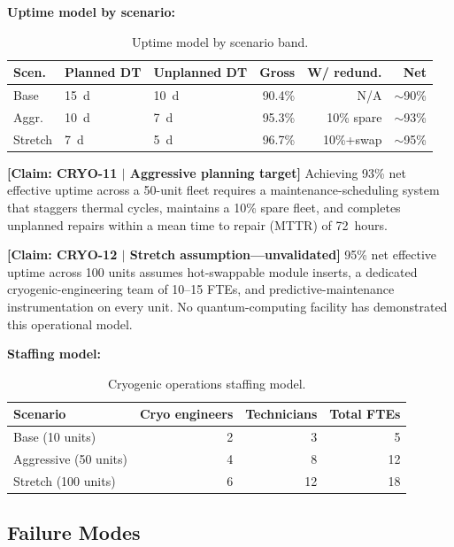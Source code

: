 \documentclass[conference]{IEEEtran}
\begin{document}
\textbf{Uptime model by scenario:}

\begin{table}[H]
\centering
\caption{Uptime model by scenario band.}
\label{tab:uptime}
\footnotesize
\begin{tabularx}{\columnwidth}{L{1.3cm}L{1.2cm}L{1.2cm}rrr}
\toprule
\textbf{Scen.} & \textbf{Planned DT} & \textbf{Unplanned DT} & \textbf{Gross} & \textbf{W/ redund.} & \textbf{Net} \\
\midrule
Base & 15~d & 10~d & 90.4\% & N/A & $\sim$90\% \\
Aggr. & 10~d & 7~d & 95.3\% & 10\% spare & $\sim$93\% \\
Stretch & 7~d & 5~d & 96.7\% & 10\%+swap & $\sim$95\% \\
\bottomrule
\end{tabularx}
\end{table}

\textbf{[Claim: CRYO-11 $|$ Aggressive planning target]} Achieving 93\% net effective uptime across a 50-unit fleet requires a maintenance-scheduling system that staggers thermal cycles, maintains a 10\% spare fleet, and completes unplanned repairs within a mean time to repair (MTTR) of 72~hours.

\textbf{[Claim: CRYO-12 $|$ Stretch assumption---unvalidated]} 95\% net effective uptime across 100 units assumes hot-swappable module inserts, a dedicated cryogenic-engineering team of 10--15 FTEs, and predictive-maintenance instrumentation on every unit. No quantum-computing facility has demonstrated this operational model.

\textbf{Staffing model:}

\begin{table}[H]
\centering
\caption{Cryogenic operations staffing model.}
\label{tab:staffing}
\footnotesize
\begin{tabularx}{\columnwidth}{lrrr}
\toprule
\textbf{Scenario} & \textbf{Cryo engineers} & \textbf{Technicians} & \textbf{Total FTEs} \\
\midrule
Base (10 units) & 2 & 3 & 5 \\
Aggressive (50 units) & 4 & 8 & 12 \\
Stretch (100 units) & 6 & 12 & 18 \\
\bottomrule
\end{tabularx}
\end{table}

\subsection{Failure Modes}
\end{document}
